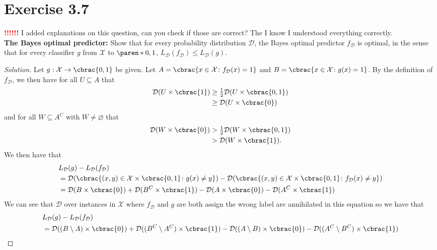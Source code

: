\documentclass[10pt, a4paper, twoside]{amsart}
\DeclarePairedDelimiter\cbrac\{\}
\DeclarePairedDelimiter\paren()
\renewcommand{\c}{\ensuremath{\colon}}
\newcommand{\se}{\ensuremath{\subseteq}}
\newenvironment{solution}
               {\let\oldqedsymbol=\qedsymbol
                \renewcommand{\qedsymbol}{$\blacktriangleleft$}
                \begin{proof}[Solution]}
               {\end{proof}
                \renewcommand{\qedsymbol}{\oldqedsymbol}}
\newcommand{\TODO}{\textcolor{red}{\textbf{!!!!!! }}}
\begin{document}
\section*{Exercise 3.7}
\TODO I added explanations on this question, can you check if those are correct? The I know I understood everything correctly.\\

\textbf{The Bayes optimal predictor:} Show that for every probability distribution $\mathcal{D}$, the Bayes optimal predictor $f_{\mathcal{D}}$ is optimal, in the sense that for every classifier $g$ from $\mathcal{X}$ to $\paren*{0,1}$, $L_{\mathcal{D}}(f_{\mathcal{D}}) \leq L_{\mathcal{D}}(g)$.
\begin{solution}
Let $g:\mathcal{X} \to \cbrac{0,1}$ be given.
Let $A=\cbrac{x \in \mathcal{X} \c f_{\mathcal{D}}(x)=1}$ and $B=\cbrac{x \in \mathcal{X} \c g(x)=1}$.
By the definition of $f_{\mathcal{D}}$, we then have for all $U\se A$ that
\begin{align*}
 \mathcal{D}(U\times\cbrac{1}) & \geq \tfrac{1}{2}\mathcal{D}(U \times \cbrac{0,1}) \\
 & \geq \mathcal{D}(U\times\cbrac{0})
\end{align*}
and for all $W \se A^C$ with $W \neq \varnothing$ that
\begin{align*}
 \mathcal{D}(W\times\cbrac{0}) &> \tfrac{1}{2}\mathcal{D}(W \times \cbrac{0,1}) \\
 &> \mathcal{D}(W\times\cbrac{1}).
\end{align*}
We then have that
\begin{align*}
&L_{\mathcal{D}}(g)-L_{\mathcal{D}}(f_{\mathcal{D}})\\
 &= \mathcal{D}(\cbrac{(x,y)\in \mathcal{X}\times\cbrac{0,1} \c g(x)\neq y})- 
   \mathcal{D}(\cbrac{(x,y)\in \mathcal{X}\times\cbrac{0,1} \c f_{\mathcal{D}}(x)\neq y}) \\
&= \mathcal{D}(B\times\cbrac{0})+\mathcal{D}(B^C\times\cbrac{1}) - 
 \mathcal{D}(A\times\cbrac{0})-\mathcal{D}(A^C\times\cbrac{1}) \\
\end{align*}
We can see that $\mathcal{D}$ over instances in $\mathcal{X}$ where $f_{\mathcal{D}}$ and $g$ are both assign the wrong label are annihilated in this equation so we have that
\begin{align*}
  &L_{\mathcal{D}}(g)-L_{\mathcal{D}}(f_{\mathcal{D}})\\
 &=  \mathcal{D}((B\setminus A)\times\cbrac{0})+ \mathcal{D}((B^C\setminus A^C)\times\cbrac{1})
- \mathcal{D}((A\setminus B)\times\cbrac{0})- \mathcal{D}((A^C\setminus B^C)\times\cbrac{1}) \\

\end{align*}
\end{solution}
\end{document}
